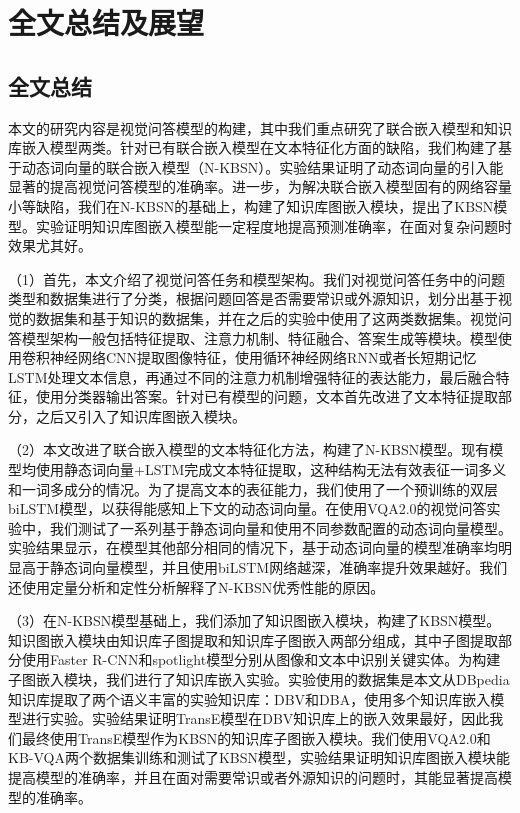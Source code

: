 \chapter{全文总结及展望}
\section{全文总结}
本文的研究内容是视觉问答模型的构建，其中我们重点研究了联合嵌入模型和知识库嵌入模型两类。针对已有联合嵌入模型在文本特征化方面的缺陷，我们构建了基于动态词向量的联合嵌入模型（N-KBSN）。实验结果证明了动态词向量的引入能显著的提高视觉问答模型的准确率。进一步，为解决联合嵌入模型固有的网络容量小等缺陷，我们在N-KBSN的基础上，构建了知识库图嵌入模块，提出了KBSN模型。实验证明知识库图嵌入模型能一定程度地提高预测准确率，在面对复杂问题时效果尤其好。

（1）首先，本文介绍了视觉问答任务和模型架构。我们对视觉问答任务中的问题类型和数据集进行了分类，根据问题回答是否需要常识或外源知识，划分出基于视觉的数据集和基于知识的数据集，并在之后的实验中使用了这两类数据集。视觉问答模型架构一般包括特征提取、注意力机制、特征融合、答案生成等模块。模型使用卷积神经网络CNN提取图像特征，使用循环神经网络RNN或者长短期记忆LSTM处理文本信息，再通过不同的注意力机制增强特征的表达能力，最后融合特征，使用分类器输出答案。针对已有模型的问题，文本首先改进了文本特征提取部分，之后又引入了知识库图嵌入模块。

（2）本文改进了联合嵌入模型的文本特征化方法，构建了N-KBSN模型。现有模型均使用静态词向量+LSTM完成文本特征提取，这种结构无法有效表征一词多义和一词多成分的情况。为了提高文本的表征能力，我们使用了一个预训练的双层biLSTM模型，以获得能感知上下文的动态词向量。在使用VQA2.0的视觉问答实验中，我们测试了一系列基于静态词向量和使用不同参数配置的动态词向量模型。实验结果显示，在模型其他部分相同的情况下，基于动态词向量的模型准确率均明显高于静态词向量模型，并且使用biLSTM网络越深，准确率提升效果越好。我们还使用定量分析和定性分析解释了N-KBSN优秀性能的原因。

（3）在N-KBSN模型基础上，我们添加了知识图嵌入模块，构建了KBSN模型。知识图嵌入模块由知识库子图提取和知识库子图嵌入两部分组成，其中子图提取部分使用Faster R-CNN和spotlight模型分别从图像和文本中识别关键实体。为构建子图嵌入模块，我们进行了知识库嵌入实验。实验使用的数据集是本文从DBpedia知识库提取了两个语义丰富的实验知识库：DBV和DBA，使用多个知识库嵌入模型进行实验。实验结果证明TransE模型在DBV知识库上的嵌入效果最好，因此我们最终使用TransE模型作为KBSN的知识库子图嵌入模块。我们使用VQA2.0和KB-VQA两个数据集训练和测试了KBSN模型，实验结果证明知识库图嵌入模块能提高模型的准确率，并且在面对需要常识或者外源知识的问题时，其能显著提高模型的准确率。

